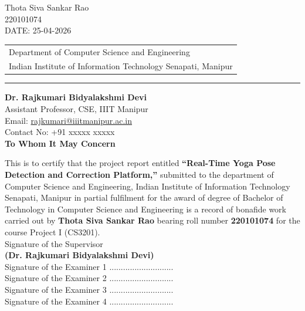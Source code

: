 \documentclass[a4paper, 11pt, oneside]{report}
\begin{document}
\vspace{2cm}
\noindent Thota Siva Sankar Rao \\
220101074 \\
DATE: 25-04-2026

\newpage

\begin{center}
	\thispagestyle{empty}
		
		\begin{table}[H]
			\centering
			\begin{tabular}{l}
				Department of Computer Science and Engineering \\
				Indian Institute of Information Technology Senapati, Manipur \\
			\end{tabular}
		\end{table}
		\par\noindent\rule{\textwidth}{0.4pt}
		\vspace{0.5cm}
		\noindent \textbf{Dr. Rajkumari Bidyalakshmi Devi} \\
		Assistant Professor, CSE, IIIT Manipur \\
		Email: \href{mailto:rajkumari@iiitmanipur.ac.in}{rajkumari@iiitmanipur.ac.in} \\
		Contact No: +91 xxxxx xxxxx \\
		
		\vspace{2cm}
		{\huge \textbf{To Whom It May Concern}} \\
		\vspace{1cm}
		
		\large{This is to certify that the project report entitled \textbf{``Real-Time Yoga Pose Detection and Correction Platform,''} submitted to the department of Computer Science and Engineering, Indian Institute of Information Technology Senapati, Manipur in partial fulfilment for the award of degree of Bachelor of Technology in Computer Science and Engineering is a record of bonafide work carried out by \textbf{Thota Siva Sankar Rao} bearing roll number \textbf{220101074} for the course Project I (CS3201).}\\
		
		\vspace{2cm}
		\noindent Signature of the Supervisor \\
		\textbf{(Dr. Rajkumari Bidyalakshmi Devi)} \\
		
		\vspace{1.5cm}
		\noindent Signature of the Examiner 1 ............................ \\
		\noindent Signature of the Examiner 2 ............................ \\
		\noindent Signature of the Examiner 3 ............................ \\
		\noindent Signature of the Examiner 4 ............................ \\
	\end{center}
\newpage
 
\end{document}
